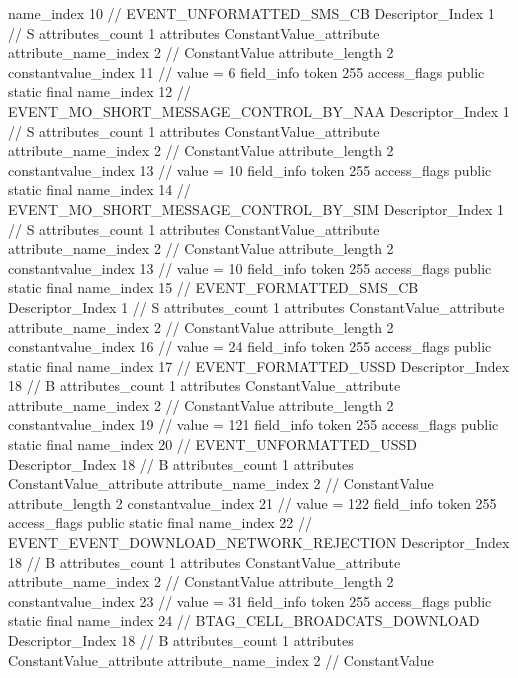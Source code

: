 {{{{{				name_index	10		// EVENT_UNFORMATTED_SMS_CB
				Descriptor_Index	1		// S
				attributes_count	1
				attributes {
				ConstantValue_attribute {
					attribute_name_index	2		// ConstantValue
					attribute_length	2
					constantvalue_index	11		// value = 6
				}
				}
			}
			field_info {
				token	255
				access_flags	public static final
				name_index	12		// EVENT_MO_SHORT_MESSAGE_CONTROL_BY_NAA
				Descriptor_Index	1		// S
				attributes_count	1
				attributes {
				ConstantValue_attribute {
					attribute_name_index	2		// ConstantValue
					attribute_length	2
					constantvalue_index	13		// value = 10
				}
				}
			}
			field_info {
				token	255
				access_flags	public static final
				name_index	14		// EVENT_MO_SHORT_MESSAGE_CONTROL_BY_SIM
				Descriptor_Index	1		// S
				attributes_count	1
				attributes {
				ConstantValue_attribute {
					attribute_name_index	2		// ConstantValue
					attribute_length	2
					constantvalue_index	13		// value = 10
				}
				}
			}
			field_info {
				token	255
				access_flags	public static final
				name_index	15		// EVENT_FORMATTED_SMS_CB
				Descriptor_Index	1		// S
				attributes_count	1
				attributes {
				ConstantValue_attribute {
					attribute_name_index	2		// ConstantValue
					attribute_length	2
					constantvalue_index	16		// value = 24
				}
				}
			}
			field_info {
				token	255
				access_flags	public static final
				name_index	17		// EVENT_FORMATTED_USSD
				Descriptor_Index	18		// B
				attributes_count	1
				attributes {
				ConstantValue_attribute {
					attribute_name_index	2		// ConstantValue
					attribute_length	2
					constantvalue_index	19		// value = 121
				}
				}
			}
			field_info {
				token	255
				access_flags	public static final
				name_index	20		// EVENT_UNFORMATTED_USSD
				Descriptor_Index	18		// B
				attributes_count	1
				attributes {
				ConstantValue_attribute {
					attribute_name_index	2		// ConstantValue
					attribute_length	2
					constantvalue_index	21		// value = 122
				}
				}
			}
			field_info {
				token	255
				access_flags	public static final
				name_index	22		// EVENT_EVENT_DOWNLOAD_NETWORK_REJECTION
				Descriptor_Index	18		// B
				attributes_count	1
				attributes {
				ConstantValue_attribute {
					attribute_name_index	2		// ConstantValue
					attribute_length	2
					constantvalue_index	23		// value = 31
				}
				}
			}
			field_info {
				token	255
				access_flags	public static final
				name_index	24		// BTAG_CELL_BROADCATS_DOWNLOAD
				Descriptor_Index	18		// B
				attributes_count	1
				attributes {
				ConstantValue_attribute {
					attribute_name_index	2		// ConstantValue
}}}}}}}
